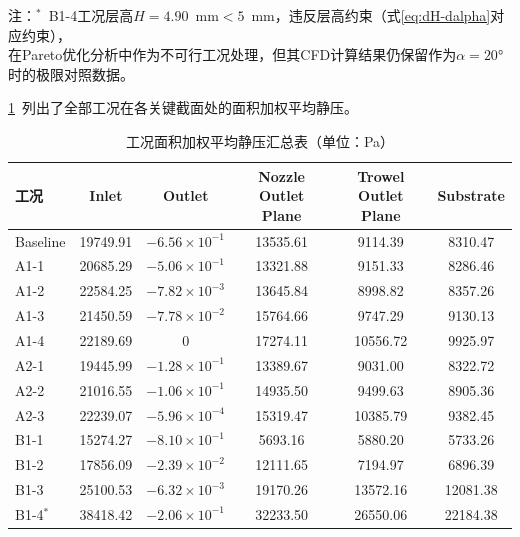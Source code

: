 \begin{table}[!htb]
  \vspace{0.5em}
  \begin{flushleft}
  注：$^*$~B1-4工况层高$H=4.90$~mm$<5$~mm，违反层高约束（式\ref{eq:dH-dalpha}对应约束），\\
  在Pareto优化分析中作为不可行工况处理，但其CFD计算结果仍保留作为$\alpha=20°$时的极限对照数据。
  \end{flushleft}
\end{table}



\cref{tab:appendix-pressure-awa}~列出了全部工况在各关键截面处的面积加权平均静压。

\begin{table}[!htb]
  \caption{工况面积加权平均静压汇总表（单位：Pa）}\label{tab:appendix-pressure-awa}
  \centering
  \begin{tabular}{@{}lccccc@{}}
    \toprule
    工况 & Inlet & Outlet & Nozzle Outlet Plane & Trowel Outlet Plane & Substrate \\
    \midrule
    Baseline     & 19749.91  & $-6.56\times10^{-1}$ & 13535.61 &  9114.39 &  8310.47 \\
    A1-1         & 20685.29  & $-5.06\times10^{-1}$ & 13321.88 &  9151.33 &  8286.46 \\
    A1-2         & 22584.25  & $-7.82\times10^{-3}$ & 13645.84 &  8998.82 &  8357.26 \\
    A1-3         & 21450.59  & $-7.78\times10^{-2}$ & 15764.66 &  9747.29 &  9130.13 \\
    A1-4         & 22189.69  & $0$                  & 17274.11 & 10556.72 &  9925.97 \\
    A2-1         & 19445.99  & $-1.28\times10^{-1}$ & 13389.67 &  9031.00 &  8322.72 \\
    A2-2         & 21016.55  & $-1.06\times10^{-1}$ & 14935.50 &  9499.63 &  8905.36 \\
    A2-3         & 22239.07  & $-5.96\times10^{-4}$ & 15319.47 & 10385.79 &  9382.45 \\
    B1-1         & 15274.27  & $-8.10\times10^{-1}$ &  5693.16 &  5880.20 &  5733.26 \\
    B1-2         & 17856.09  & $-2.39\times10^{-2}$ & 12111.65 &  7194.97 &  6896.39 \\
    B1-3         & 25100.53  & $-6.32\times10^{-3}$ & 19170.26 & 13572.16 & 12081.38 \\
    B1-4$^*$     & 38418.42  & $-2.06\times10^{-1}$ & 32233.50 & 26550.06 & 22184.38 \\

\end{tabular}
\end{table}
